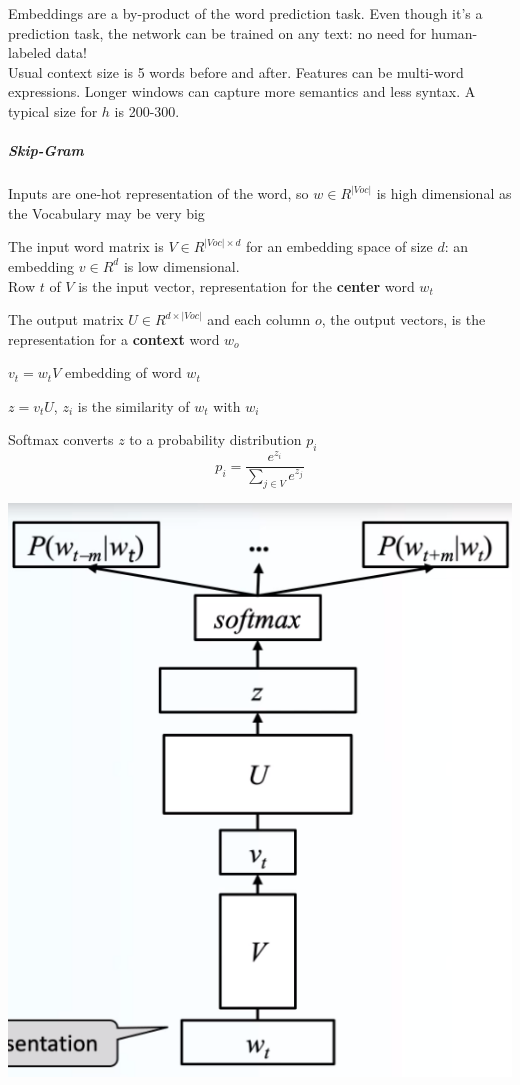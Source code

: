 \documentclass[10pt]{report}
\begin{document}
Embeddings are a by-product of the word prediction task. Even though it's a prediction task, the network can be trained on any text: no need for human-labeled data!\\
Usual context size is 5 words before and after. Features can be multi-word expressions. Longer windows can capture more semantics and less syntax. A typical size for $h$ is 200-300.
\subparagraph{Skip-Gram}
\begin{multicols}{2}
\begin{list}{}{}
	\item Inputs are one-hot representation of the word, so $w\in R^{|Voc|}$ is high dimensional as the Vocabulary may be very big
	\item The input word matrix is $V\in R^{|Voc|\times d}$ for an embedding space of size $d$: an embedding $v\in R^d$ is low dimensional.\\
	Row $t$ of $V$ is the input vector, representation for the \textbf{center} word $w_t$
	\item The output matrix $U\in R^{d\times|Voc|}$ and each column $o$, the output vectors, is the representation for a \textbf{context} word $w_o$
	\item $v_t = w_tV$ embedding of word $w_t$
	\item $z=v_tU$, $z_i$ is the similarity of $w_t$ with $w_i$
	\item Softmax converts $z$ to a probability distribution $p_i$ $$p_i=\frac{e^{z_i}}{\sum_{j\in V}e^{z_j}}$$
\end{list}
\columnbreak
\begin{center}
	\includegraphics[scale=0.5]{5.png}
\end{center}
\end{multicols}
\end{document}
